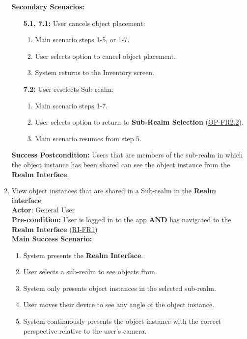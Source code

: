 \documentclass{article}
\begin{document}
\begin{enumerate}[label=\textbf{UC\arabic*}]
        \textbf{Secondary Scenarios:}
        \begin{itemize}
            \item[{\bf 5.1, 7.1:}] User cancels object placement:
            \begin{enumerate}[label=\textbf{\arabic*.}]
                \item Main scenario steps 1-5, or 1-7.
                \item User selects option to cancel object placement.
                \item System returns to the Inventory screen.
            \end{enumerate}
    
            \item[{\bf 7.2:}] User reselects Sub-realm:
            \begin{enumerate}[label=\textbf{\arabic*.}]
                \item Main scenario steps 1-7.
                \item User selects option to return to \textbf{Sub-Realm Selection} (\hyperref[ssub:object_placement]{OP-FR2.2}).
                \item Main scenario resumes from step 5.
            \end{enumerate}
        \end{itemize}
    
        \textbf{Success Postcondition:} Users that are members of the sub-realm in which the object instance has been shared can see the object instance from the \textbf{Realm Interface}.
    
    \item \label{uc:10} View object instances that are shared in a Sub-realm in the \textbf{Realm interface} \\ 
        \textbf{Actor}: General User \\ 
        \textbf{Pre-condition:} User is logged in to the app \textbf{AND} has navigated to the \textbf{Realm Interface} (\hyperref[ssub:realm_interface]{RI-FR1}) \\
    
        \textbf{Main Success Scenario:}
        \begin{enumerate}[label=\textbf{\arabic*.}]
            \item System presents the \textbf{Realm Interface}.
            \item User selects a sub-realm to see objects from.
            \item System only presents object instances in the selected sub-realm.
            \item User moves their device to see any angle of the object instance.
            \item System continuously presents the object instance with the correct perspective relative to the user’s camera.
        \end{enumerate}
    

\end{enumerate}
\end{document}
